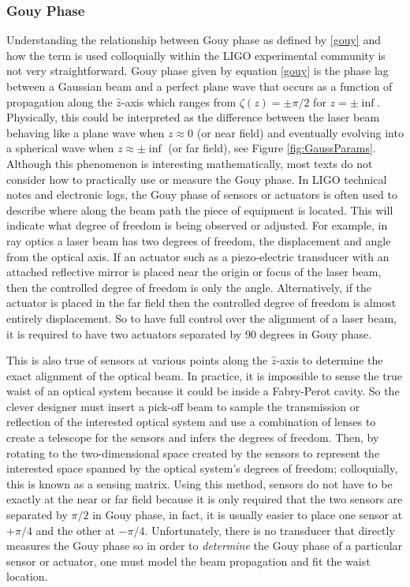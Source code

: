 		\subsubsection{Gouy Phase}
		Understanding the relationship between Gouy phase as defined by \ref{gouy} and how the term is used colloquially within the LIGO experimental community is not very straightforward.  Gouy phase given by equation \ref{gouy} is the phase lag between a Gaussian beam and a perfect plane wave that occurs as a function of propagation along the $\hat{z}$-axis which ranges from $\zeta(z) = \pm \pi/2$ for $z =\pm \inf$.  Physically, this could be interpreted as the difference between the laser beam behaving like a plane wave when $z\approx0$ (or near field) and eventually evolving into a spherical wave when $z\approx \pm \inf$ (or far field), see Figure \ref{fig:GaussParams}.  Although this phenomenon is interesting mathematically, most texts do not consider how to practically use or measure the Gouy phase.  In LIGO technical notes and electronic logs, the Gouy phase of sensors or actuators is often used to describe where along the beam path the piece of equipment is located.  This will indicate what degree of freedom is being observed or adjusted.  For example, in ray optics \cite{Saleh} a laser beam has two degrees of freedom, the displacement and angle from the optical axis.  If an actuator such as a piezo-electric transducer with an attached reflective mirror is placed near the origin or focus of the laser beam, then the controlled degree of freedom is only the angle.  Alternatively, if the actuator is placed in the far field then the controlled degree of freedom is almost entirely displacement.  So to have full control over the alignment of a laser beam, it is required to have two actuators separated by 90 degrees in Gouy phase.  
		
		This is also true of sensors at various points along the $\hat{z}$-axis to determine the exact alignment of the optical beam. In practice, it is impossible to sense the true waist of an optical system because it could be inside a Fabry-Perot cavity.  So the clever designer must insert a pick-off beam to sample the transmission or reflection of the interested optical system and use a combination of lenses to create a telescope for the sensors and infers the degrees of freedom.  Then, by rotating to the two-dimensional space created by the sensors to represent the interested space spanned by the optical system's degrees of freedom; colloquially, this is known as a sensing matrix.  Using this method, sensors do not have to be exactly at the near or far field because it is only required that the two sensors are separated by $\pi/2$ in Gouy phase, in fact, it is usually easier to place one sensor at $+\pi/4$ and the other at $-\pi/4$. Unfortunately, there is no transducer that directly measures the Gouy phase so in order to \textit{determine} the Gouy phase of a particular sensor or actuator, one must model the beam propagation and fit the waist location.
		
